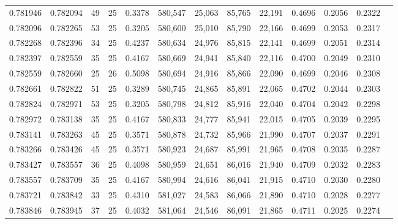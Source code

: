 \begin{tabular}{rrrrrrrrrrrrr}
0.781946 & 0.782094 &    49 &  25 &                                     0.3378 & 580,547 &  25,063 &  85,765 &  22,191 & 0.4696 & 0.2056 & 0.2322 \\
0.782096 & 0.782265 &    53 &  25 &                                     0.3205 & 580,600 &  25,010 &  85,790 &  22,166 & 0.4699 & 0.2053 & 0.2317 \\
0.782268 & 0.782396 &    34 &  25 &                                     0.4237 & 580,634 &  24,976 &  85,815 &  22,141 & 0.4699 & 0.2051 & 0.2314 \\
0.782397 & 0.782559 &    35 &  25 &                                     0.4167 & 580,669 &  24,941 &  85,840 &  22,116 & 0.4700 & 0.2049 & 0.2310 \\
0.782559 & 0.782660 &    25 &  26 &                                     0.5098 & 580,694 &  24,916 &  85,866 &  22,090 & 0.4699 & 0.2046 & 0.2308 \\
0.782661 & 0.782822 &    51 &  25 &                                     0.3289 & 580,745 &  24,865 &  85,891 &  22,065 & 0.4702 & 0.2044 & 0.2303 \\
0.782824 & 0.782971 &    53 &  25 &                                     0.3205 & 580,798 &  24,812 &  85,916 &  22,040 & 0.4704 & 0.2042 & 0.2298 \\
0.782972 & 0.783138 &    35 &  25 &                                     0.4167 & 580,833 &  24,777 &  85,941 &  22,015 & 0.4705 & 0.2039 & 0.2295 \\
0.783141 & 0.783263 &    45 &  25 &                                     0.3571 & 580,878 &  24,732 &  85,966 &  21,990 & 0.4707 & 0.2037 & 0.2291 \\
0.783266 & 0.783426 &    45 &  25 &                                     0.3571 & 580,923 &  24,687 &  85,991 &  21,965 & 0.4708 & 0.2035 & 0.2287 \\
0.783427 & 0.783557 &    36 &  25 &                                     0.4098 & 580,959 &  24,651 &  86,016 &  21,940 & 0.4709 & 0.2032 & 0.2283 \\
0.783557 & 0.783709 &    35 &  25 &                                     0.4167 & 580,994 &  24,616 &  86,041 &  21,915 & 0.4710 & 0.2030 & 0.2280 \\
0.783721 & 0.783842 &    33 &  25 &                                     0.4310 & 581,027 &  24,583 &  86,066 &  21,890 & 0.4710 & 0.2028 & 0.2277 \\
0.783846 & 0.783945 &    37 &  25 &                                     0.4032 & 581,064 &  24,546 &  86,091 &  21,865 & 0.4711 & 0.2025 & 0.2274 \\

\end{tabular}
